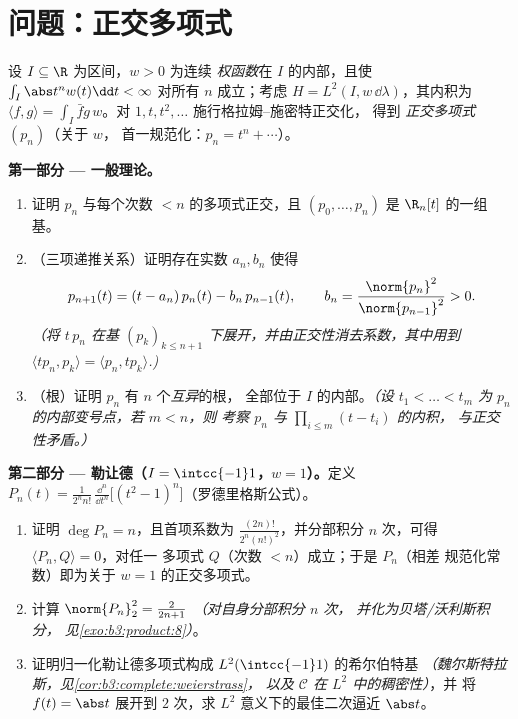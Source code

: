 \section{问题：正交多项式}

\begin{problem}\label{pb:b3:hilbert:1}
设 $I \subseteq \R$ 为区间，$w > 0$ 为连续
\emph{权函数}在 $I$ 的内部，且使 $\int_I
\abs t^nw(t)\dd t < \infty$ 对所有 $n$ 成立；考虑 $H = L^2(I,
w\,\dd\lambda)$，其内积为 $\langle f, g\rangle = \int_I \bar
fg\,w$。对 $1, t, t^2, \dots$ 施行格拉姆–施密特正交化，
得到 \emph{正交多项式} $(p_n)$（关于 $w$，
首一规范化：$p_n = t^n + \cdots$）。

\medskip
\noindent\textbf{第一部分 --- 一般理论。}
\begin{enumerate}
  \item 证明 $p_n$ 与每个次数
        $< n$ 的多项式正交，且 $(p_0, \dots, p_n)$ 是
        $\R_n[t]$ 的一组基。
  \item （三项递推关系）证明存在实数 $a_n,
        b_n$ 使得
        \[
        p_{n+1}(t) = (t - a_n)\,p_n(t) - b_n\,p_{n-1}(t),
        \qquad b_n = \frac{\norm{p_n}^2}{\norm{p_{n-1}}^2} >
        0 .
        \]
        \emph{（将 $t\,p_n$ 在基 $(p_k)_{k \leq
        n+1}$ 下展开，并由正交性消去系数，其中用到
        $\langle tp_n, p_k\rangle = \langle p_n,
        tp_k\rangle$.)}
  \item （根）证明 $p_n$ 有 $n$ 个\emph{互异}的根，
        全部位于 $I$ 的内部。\emph{（设 $t_1 < \dots < t_m$ 为
        $p_n$ 的内部变号点，若 $m < n$，则
        考察 $p_n$ 与 $\prod_{i\leq m}(t - t_i)$ 的内积，
        与正交性矛盾。）}
\end{enumerate}

\medskip
\noindent\textbf{第二部分 --- 勒让德（$I = \intcc{-1}1$，$w =
1$）。}定义 $P_n(t) = \frac{1}{2^nn!}\,\frac{\dd^n}{\dd
t^n}\bigl[(t^2 - 1)^n\bigr]$（罗德里格斯公式）。
\begin{enumerate}[resume]
  \item 证明 $\deg P_n = n$，且首项系数为
        $\frac{(2n)!}{2^n(n!)^2}$，并分部积分
        $n$ 次，可得 $\langle P_n, Q\rangle = 0$，对任一
        多项式 $Q$（次数 $< n$）成立；于是 $P_n$（相差
        规范化常数）即为关于 $w = 1$ 的正交多项式。
  \item 计算 $\norm{P_n}_2^2 = \frac{2}{2n+1}$
        \emph{（对自身分部积分 $n$ 次，
        并化为贝塔/沃利斯积分，
        见\cref{exo:b3:product:8}）}。
  \item 证明归一化勒让德多项式构成
        $L^2(\intcc{-1}1)$ 的希尔伯特基
        \emph{（魏尔斯特拉斯，见\cref{cor:b3:complete:weierstrass}，
        以及 $\mathcal C$ 在 $L^2$ 中的稠密性）}，并
        将 $f(t) = \abs t$ 展开到 $2$ 次，求
        $L^2$ 意义下的最佳二次逼近 $\abs t$。
\end{enumerate}


\end{problem}
